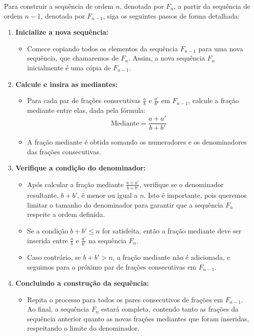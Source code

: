 \documentclass{hipatia}
\theoremstyle{definition} %
\begin{document}
Para construir a sequência de ordem \(n\), denotada por \(F_n\), a partir da sequência de ordem \(n-1\), denotada por \(F_{n-1}\), siga os seguintes passos de forma detalhada:

\begin{enumerate}
    \item \textbf{Inicialize a nova sequência:} 
    \begin{itemize}
        \item Comece copiando todos os elementos da sequência \(F_{n-1}\) para uma nova sequência, que chamaremos de \(F_n\). Assim, a nova sequência \(F_n\) inicialmente é uma cópia de \(F_{n-1}\).
    \end{itemize}

    \item \textbf{Calcule e insira as mediantes:} 
    \begin{itemize}
        \item Para cada par de frações consecutivas \(\frac{a}{b}\) e \(\frac{a'}{b'}\) em \(F_{n-1}\), calcule a fração mediante entre elas, dada pela fórmula:
        \[
        \text{Mediante} = \frac{a + a'}{b + b'}
        \]
        \item A fração mediante é obtida somando os numeradores e os denominadores das frações consecutivas.
    \end{itemize}

    \item \textbf{Verifique a condição do denominador:}
    \begin{itemize}
        \item Após calcular a fração mediante \(\frac{a + a'}{b + b'}\), verifique se o denominador resultante, \(b + b'\), é menor ou igual a \(n\). Isto é importante, pois queremos limitar o tamanho do denominador para garantir que a sequência \(F_n\) respeite a ordem definida.
        \item Se a condição \(b + b' \leq n\) for satisfeita, então a fração mediante deve ser inserida entre \(\frac{a}{b}\) e \(\frac{a'}{b'}\) na sequência \(F_n\).
        \item Caso contrário, se \(b + b' > n\), a fração mediante não é adicionada, e seguimos para o próximo par de frações consecutivas em \(F_{n-1}\).
    \end{itemize}
    
    \item \textbf{Concluindo a construção da sequência:}
    \begin{itemize}
        \item Repita o processo para todos os pares consecutivos de frações em \(F_{n-1}\). Ao final, a sequência \(F_n\) estará completa, contendo tanto as frações da sequência anterior quanto as novas frações mediantes que foram inseridas, respeitando o limite do denominador.
    \end{itemize}
\end{enumerate}
\end{document}
